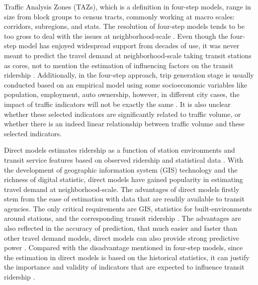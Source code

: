Traffic Analysis Zones (TAZs), which is a definition in four-step models, range in size from block groups to census tracts, commonly working at macro scales: corridors, subregions, and stats. The resolution of four-step models tends to be too gross to deal with the issues at neighborhood-scale \cite{cervero2006alternative}. Even though the four-step model has enjoyed widespread support from decades of use, it was never meant to predict the travel demand at neighborhood-scale taking transit stations as cores, not to mention the estimation of influencing factors on the transit ridership \cite{cervero2006alternative,chu2004ridership,duduta2013direct}. Additionally, in the four-step approach, trip generation stage is usually conducted based on an empirical model using some socioeconomic variables like population, employment, auto ownership, however, in different city cases, the impact of traffic indicators will not be exactly the same \cite{jones1983demand}. It is also unclear whether these selected indicators are significantly related to traffic volume, or whether there is an indeed linear relationship between traffic volume and these selected indicators. 

Direct models estimates ridership as a function of station environments and transit service features based on observed ridership and statistical data \cite{cervero2006alternative}. With the development of geographic information system (GIS) technology and the richness of digital statistic, direct models have gained popularity in estimating travel demand at neighborhood-scale. The advantages of direct models firstly stem from the ease of estimation with data that are readily available to transit agencies. The only critical requirements are GIS, statistics for built-environments around stations, and the corresponding transit ridership \cite{guerra2012half}. The advantages are also reflected in the accuracy of prediction, that much easier and faster than other travel demand models, direct models can also provide strong predictive power \cite{lane2006sketch}. Compared with the disadvantage mentioned in four-step models, since the estimation in direct models is based on the historical statistics, it can justify the importance and validity of indicators that are expected to influence transit ridership \cite{walters2003forecasting}.

%
